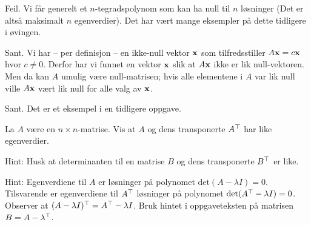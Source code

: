 \begin{losning}

\begin{punkt}
Feil. Vi får generelt et $n$-tegradspolynom som kan ha null til $n$ løsninger (Det er altså maksimalt $n$ egenverdier). Det har vært mange eksempler på dette tidligere i øvingen.
\end{punkt}

\begin{punkt}
Sant. Vi har -- per definisjon -- en ikke-null vektor $\mathbf{x}$ som tilfredsstiller $A\mathbf{x}=c\mathbf{x}$ hvor $c\neq 0$. Derfor har vi funnet en vektor $\mathbf{x}$ slik at $A\mathbf{x}$ ikke er lik null-vektoren. Men da kan $A$ umulig være null-matrisen; hvis alle elementene i $A$ var lik null ville $A\mathbf{x}$ vært lik null for alle valg av $\mathbf{x}$.
\end{punkt}


\begin{punkt}
Sant. Det er et eksempel i en tidligere oppgave.
\end{punkt}

\end{losning}

\begin{oppgave}
La $A$ være en $n\times n$-matrise. Vis at $A$ og dens transponerte $A^\top$ har like egenverdier.

\noindent
Hint: Husk at determinanten til en matrise $B$ og dens transponerte $B^\top$ er like.
\end{oppgave}

\begin{losning}
Hint: Egenverdiene til $A$ er løsninger på polynomet $\text{det}(A-\lambda I)=0$. Tilsvarende er egenverdiene til $A^\top$ løsninger på polynomet $\text{det}(A^\top-\lambda I)=0$. Observer at $(A-\lambda I)^\top=A^\top-\lambda I$. Bruk hintet i oppgaveteksten på matrisen $B=A-\lambda^\top$.
\end{losning}


